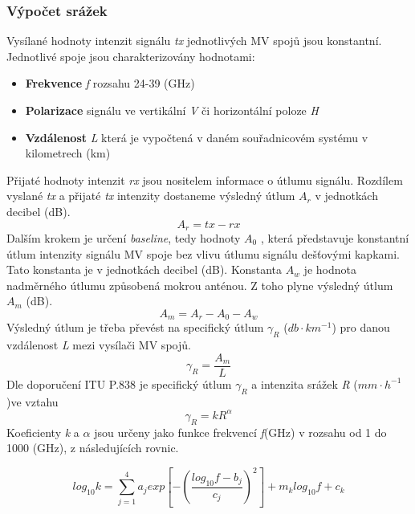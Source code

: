 \documentclass[a4paper,12pt,oneside]{report}
\begin{document}
\subsubsection{Výpočet srážek}
Vysílané hodnoty intenzit signálu \emph{tx} jednotlivých MV spojů jsou
konstantní. Jednotlivé spoje jsou charakterizovány hodnotami:
\begin{itemize}
\item \textbf{Frekvence} \emph{f} rozsahu 24-39 (GHz)
\item \textbf{Polarizace} signálu ve vertikální \emph{V} či horizontální poloze \emph{H}
\item \textbf{Vzdálenost} \emph{L} která je vypočtená v daném souřadnicovém systému v kilometrech (km)
\end{itemize}
Přijaté hodnoty intenzit \emph{rx} jsou nositelem informace o útlumu
signálu. Rozdílem vyslané \emph{tx} a přijaté \emph{tx} intenzity
dostaneme výsledný útlum \emph{$A_{r}$} v jednotkách decibel (dB).
\begin{equation}
 A_{r}=tx-rx
\end{equation}
Dalším krokem je určení \emph{baseline}, tedy hodnoty \emph{ $A_{0}$ },
 která představuje konstantní útlum intenzity signálu MV spoje bez
vlivu útlumu signálu dešťovými kapkami. Tato konstanta je v jednotkách
decibel (dB). Konstanta \emph{$A_{w}$ } je hodnota
nadměrného útlumu způsobená mokrou anténou. Z toho plyne výsledný
útlum \emph{$A_{m}$ }(dB).
\begin{equation}\label{eq:Ar}
 A_{m}=A_{r}-A_{0}-A_{w}
\end{equation}
Výsledný útlum je třeba převést na specifický útlum \emph{$\gamma_{R}
  $} ($db \cdot km^{-1}$) pro danou vzdálenost \emph{L} mezi vysílači MV spojů.
\begin{equation}
\gamma_{R} =\frac{A_{m}}{L}
\end{equation}
Dle doporučení ITU P.838 \cite{itu} je specifický útlum
\emph{$\gamma_{R} $} a intenzita srážek \emph{R} ($mm \cdot h^{-1}$)ve vztahu
\begin{equation}\label{eq:gamma}
\gamma_{R}=kR^{\alpha}
\end{equation}
Koeficienty \emph{k} a \emph{$\alpha$} jsou určeny jako funkce
frekvencí \emph{f}(GHz) v rozsahu od 1 do 1000 (GHz), z následujících
rovnic.

\begin{equation}
log_{10}k=\sum_{j=1}^{4} a_{j} exp\left [ -\left ( \frac{log_{10}f-b_{j}}{c_{j}} \right )^{2} \right ]+m {_{k}}log_{10}f+c_{k}
\end{equation}
\end{document}
